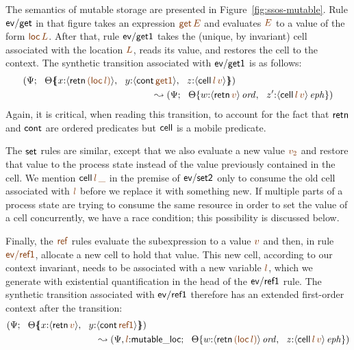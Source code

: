 The semantics of mutable storage are presented in
Figure~\ref{fig:ssos-mutable}. Rule ${\sf ev/get}$ in that figure
takes an expression $\lf{{\sf get}\,E}$ and evaluates $\lf E$ to a
value of the form $\lf{{\sf loc}\,L}$. After that, rule ${\sf
  ev/get1}$ takes the (unique, by invariant) cell associated with the
location $\lf L$, reads its value, and restores the cell to the
context. The synthetic transition associated with ${\sf ev/get1}$ is
as follows:
\begin{align*}
(\Psi&;  ~~ \frameoff{\Theta}{x{:}{\susp{{\sf retn}\,\lf{({\sf loc}\,l)}}},
 ~~ y{:}{\susp{{\sf cont}\,\lf{\sf get1}}}, 
 ~~ z{:}{\susp{{\sf cell}\,\lf{l}\,\lf{v}}}})\\
& \qquad \qquad\qquad\qquad\qquad\qquad~ \leadsto 
(\Psi; ~~ \tackon{\Theta}{w{:}\istrue{\susp{{\sf retn}\,\lf{v}}},
 ~~ z'{:}\iseph{\susp{{\sf cell}\,\lf{l}\,\lf{v}}}})
\end{align*}
Again, it is critical, when reading this transition, to account for the fact
that ${\sf retn}$ and ${\sf cont}$ are ordered predicates but ${\sf
  cell}$ is a mobile predicate.

The ${\sf set}$ rules are similar, except that we also evaluate a new
value $\lf{v_2}$ and restore that value to the process state instead
of the value previously contained in the cell. We mention ${\sf
  cell}\,\lf{l}\,\lf{\_}$ in the premise of ${\sf ev/set2}$ only to
consume the old cell associated with $\lf{l}$ before we replace it
with something new. If multiple parts of a process state are trying to
consume the same resource in order to set the value of a cell
concurrently, we have a race condition; this possibility is discussed
below.

Finally, the $\lf{\sf ref}$ rules evaluate the subexpression to a value
$\lf{v}$ and then, in rule $\lf{\sf ev/ref1}$, allocate a new cell to hold
that value. This new cell, according to our context invariant, needs
to be associated with a new variable $\lf{l}$, which we generate with
existential quantification in the head of the ${\sf ev/ref1}$ rule.
The synthetic transition associated with ${\sf ev/ref1}$ therefore has
an extended first-order context after the transition:
\begin{align*}
(\Psi&; ~~ \frameoff{\Theta}{x{:}\susp{{\sf retn}\,\lf{v}}, ~~ y{:}\susp{{\sf cont}\,\lf{\sf ref1}}})
\\
& \qquad\qquad\qquad\qquad~\leadsto 
(\Psi, \lf{l}{:}{\sf mutable\_loc}; ~~ \tackon{\Theta}{w{:}\istrue{\susp{{\sf retn}\,\lf{({\sf loc}\,l)}}}, ~~
z{:}\iseph{\susp{{\sf cell}\,\lf{l}\,\lf{v}}}})
\end{align*}

